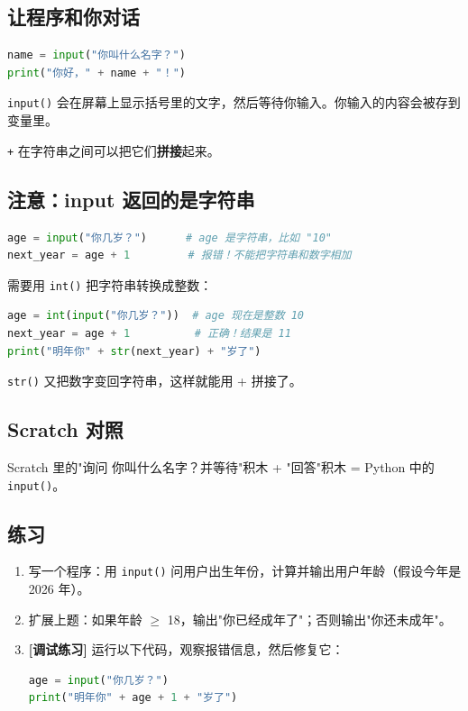 \documentclass[a4paper,12pt]{ctexart}
\begin{document}
\subsection*{让程序和你对话}

\begin{lstlisting}[language=Python]
name = input("你叫什么名字？")
print("你好，" + name + "！")
\end{lstlisting}

\texttt{input()} 会在屏幕上显示括号里的文字，然后等待你输入。你输入的内容会被存到变量里。

\texttt{+} 在字符串之间可以把它们\textbf{拼接}起来。

\subsection*{注意：input 返回的是字符串}

\begin{lstlisting}[language=Python]
age = input("你几岁？")      # age 是字符串，比如 "10"
next_year = age + 1         # 报错！不能把字符串和数字相加
\end{lstlisting}

需要用 \texttt{int()} 把字符串转换成整数：

\begin{lstlisting}[language=Python]
age = int(input("你几岁？"))  # age 现在是整数 10
next_year = age + 1          # 正确！结果是 11
print("明年你" + str(next_year) + "岁了")
\end{lstlisting}

\texttt{str()} 又把数字变回字符串，这样就能用 + 拼接了。

\subsection*{Scratch 对照}

Scratch 里的"询问 你叫什么名字？并等待"积木 + "回答"积木 = Python 中的 \texttt{input()}。

\subsection*{练习}

\begin{enumerate}
  \item 写一个程序：用 \texttt{input()} 问用户出生年份，计算并输出用户年龄（假设今年是 2026 年）。
  \item 扩展上题：如果年龄 $\ge$ 18，输出"你已经成年了"；否则输出"你还未成年"。
  \item \textbf{[调试练习]} 运行以下代码，观察报错信息，然后修复它：
\begin{lstlisting}[language=Python]
age = input("你几岁？")
print("明年你" + age + 1 + "岁了")
\end{lstlisting}
\end{enumerate}
\end{document}
